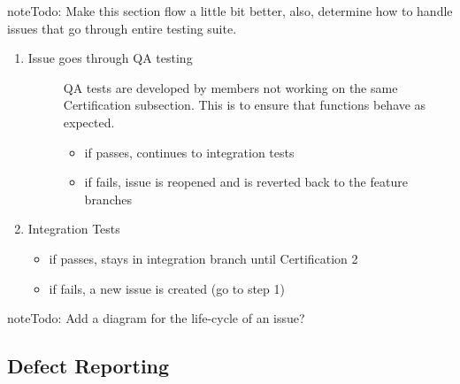 \documentclass[letterpaper,10pt,english]{sphinxmanual}
\begin{document}
\begin{sphinxadmonition}{note}{\label{test_plan/issue_management:index-2}Todo:}
Make this section flow a little bit better, also, determine how to handle issues that go through entire testing suite.
\end{sphinxadmonition}
\begin{enumerate}
\def\theenumi{\arabic{enumi}}
\def\labelenumi{\theenumi .}
\makeatletter\def\p@enumii{\p@enumi \theenumi .}\makeatother
\setcounter{enumi}{5}
\item {} \begin{description}
\item[{Issue goes through QA testing}] \leavevmode
QA tests are developed by members not working on the same Certification subsection. This is to ensure that functions behave as expected.
\begin{itemize}
\item {} 
if passes, continues to integration tests

\item {} 
if fails, issue is reopened and is reverted back to the feature branches

\end{itemize}

\end{description}

\item {} 
Integration Tests
\begin{itemize}
\item {} 
if passes, stays in integration branch until Certification 2

\item {} 
if fails, a new issue is created (go to step 1)

\end{itemize}

\end{enumerate}

\begin{sphinxadmonition}{note}{\label{test_plan/issue_management:index-3}Todo:}
Add a diagram for the life-cycle of an issue?
\end{sphinxadmonition}


\subsection{Defect Reporting}
\label{\detokenize{test_plan/issue_management:defect-reporting}}
\end{document}
